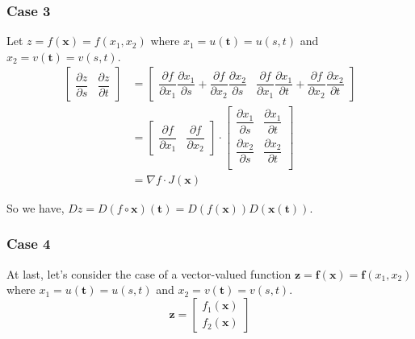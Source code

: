 \documentclass{article}
\begin{document}
\subsubsection{Case 3}
Let $z= f(\mathbf{x}) = f(x_1, x_2)$ where $x_1=u(\mathbf{t})=u(s, t)$ and
$x_2= v(\mathbf{t}) = v(s, t)$.
\begin{align*}
\begin{bmatrix}
    \dfrac{\partial z}{\partial s} &
    \dfrac{\partial z}{\partial t}
\end{bmatrix} &=
\begin{bmatrix}
    \dfrac{\partial f}{\partial x_1} \dfrac{\partial x_1}{\partial s} +
    \dfrac{\partial f}{\partial x_2} \dfrac{\partial x_2}{\partial s} &
    \dfrac{\partial f}{\partial x_1} \dfrac{\partial x_1}{\partial t} +
    \dfrac{\partial f}{\partial x_2} \dfrac{\partial x_2}{\partial t}
\end{bmatrix} \\
&=
\begin{bmatrix}
    \dfrac{\partial f}{\partial x_1} &
    \dfrac{\partial f}{\partial x_2} 
\end{bmatrix} \cdot
\begin{bmatrix}
    \dfrac{\partial x_1}{\partial s} & 
    \dfrac{\partial x_1}{\partial t} \\
    \dfrac{\partial x_2}{\partial s} & 
    \dfrac{\partial x_2}{\partial t} \\
\end{bmatrix} \\
&= \nabla f \cdot J(\mathbf{x})
\end{align*}

So we have, $Dz = D(f \circ \mathbf{x})(\mathbf{t}) =
D(f(\mathbf{x}))D(\mathbf{x}(\mathbf{t}))$.
\subsubsection{Case 4}
At last, let's consider the case of a vector-valued function $\mathbf{z} =
\mathbf{f}(\mathbf{x}) = \mathbf{f}(x_1, x_2)$ where $x_1=u(\mathbf{t})=u(s, t)$ and
$x_2= v(\mathbf{t}) = v(s, t)$.
\[
\mathbf{z} = 
\begin{bmatrix}
    f_1(\mathbf{x}) \\
    f_2(\mathbf{x})
\end{bmatrix}
\]
\end{document}
